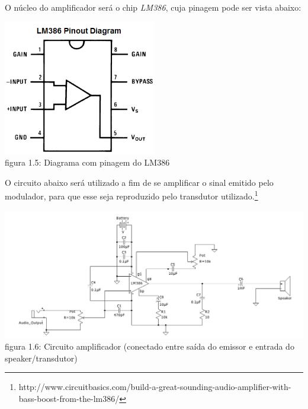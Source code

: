 \documentclass[11pt,a4paper]{report}
\begin{document}
	\paragraph{}
	O núcleo do amplificador será o chip {\it LM386}, cuja pinagem pode ser vista abaixo:
		
	\begin{center}
		\includegraphics[width=0.5\textwidth]{LM386_pinout_diagram.png}\\
		\footnotesize{figura 1.5: Diagrama com pinagem do LM386}
	\end{center}
	
	O circuito abaixo será utilizado a fim de se amplificar o sinal emitido pelo modulador, para que esse seja reproduzido pelo transdutor utilizado.\footnote{http://www.circuitbasics.com/build-a-great-sounding-audio-amplifier-with-bass-boost-from-the-lm386/}\\
	
	\begin{center}
		\includegraphics[width=\linewidth]{amplifier_circuit.png}\\
		\footnotesize{figura 1.6: Circuito amplificador (conectado entre saída do emissor e entrada do speaker/transdutor)}
	\end{center}
\end{document}
